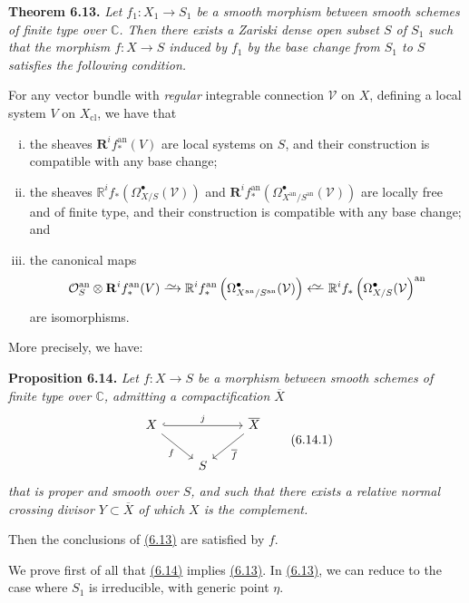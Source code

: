 \documentclass{report}
\newenvironment{itenv}[1]
  {\phantomsection\par\medskip\noindent\textbf{#1.}\itshape}
  {\par\medskip}
\renewcommand{\cal}[1]{{\mathcal{#1}}}
\newcommand{\CC}{\mathbb{C}}
\newcommand{\RR}{\mathbf{R}}
\newcommand{\an}{\mathrm{an}}
\newcommand{\cl}{\mathrm{cl}}
\newcommand{\simto}{\xrightarrow{\raisebox{-0.7ex}[0ex][0ex]{$\sim$}}}
\newcommand{\simfrom}{\xleftarrow{\raisebox{-0.7ex}[0ex][0ex]{$\sim$}}}
\newcommand{\oldpage}[1]{\marginpar{\footnotesize$\Big\vert$ \textit{p.~#1}}}
\begin{document}
\begin{itenv}{Theorem 6.13}
\label{II.6.13}
  Let $f_1\colon X_1\to S_1$ be a smooth morphism between smooth schemes of finite type over $\CC$.
  Then there exists a Zariski dense open subset $S$ of $S_1$ such that the morphism $f\colon X\to S$ induced by $f_1$ by the base change from $S_1$ to $S$ satisfies the following condition.

  For any vector bundle with \emph{regular} integrable connection $\cal{V}$ on $X$, defining a local system $V$ on $X_\cl$, we have that
  \begin{enumerate}[(i)]
    \item the sheaves $\RR^i f_*^\an(V)$ are local systems on $S$, and their construction is compatible with any base change;
    \item the sheaves $\mathbb{R}^i f_*(\Omega_{X/S}^\bullet(\cal{V}))$ and $\RR^i f_*^\an(\Omega_{X^\an/S^\an}^\bullet(\cal{V}))$ are locally free and of finite type, and their construction is compatible with any base change; and
    \item the canonical maps
      \[
        \cal{O}_S^\an\otimes\RR^i f_*^\an(V)
        \simto \mathbb{R}^i f_*^\an\left(\Omega_{X^\an/S^\an}^\bullet(\cal{V})\right)
        \simfrom \mathbb{R}^i f_*\left(\Omega_{X/S}^\bullet(\cal{V}\right)^\an
      \]
      are isomorphisms.
  \end{enumerate}
\end{itenv}

More precisely, we have:

\begin{itenv}{Proposition 6.14}
\label{II.6.14}
  Let $f\colon X\to S$ be a morphism between smooth schemes of finite type over $\CC$, admitting a compactification $\overline{X}$
  \[
  \label{II.6.14.1}
    \begin{tikzcd}
      X \ar[rr,hook,"j"] \drar[swap,"f"]
      && \overline{X} \dlar["\overline{f}"]
    \\&S&
    \end{tikzcd}
  \tag{6.14.1}
  \]
  that is proper and smooth over $S$, and such that there exists a relative normal crossing divisor $Y\subset\overline{X}$ of which $X$ is the complement.

\oldpage{107}
  Then the conclusions of \hyperref[II.6.13]{(6.13)} are satisfied by $f$.
\end{itenv}

We prove first of all that \hyperref[II.6.14]{(6.14)} implies \hyperref[II.6.13]{(6.13)}.
In \hyperref[II.6.13]{(6.13)}, we can reduce to the case where $S_1$ is irreducible, with generic point $\eta$.
\end{document}
